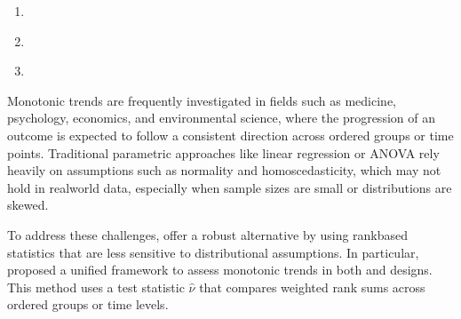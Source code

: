 \documentclass[letterpaper,10pt,english]{jupyterBook}
\begin{document}
\begin{enumerate}
\begin{itemize}
\item {} 
 {\hyperref[\detokenize{intro:visuals.md:balanced-sample-visualization}]{}}

\item {} 
 {\hyperref[\detokenize{intro:visuals.md:unbalanced-sample-visualization}]{}}

\end{itemize}

\item {} 
\sphinxAtStartPar
{\hyperref[\detokenize{intro:discussion.md}]{}}

\item {} 
\sphinxAtStartPar
{\hyperref[\detokenize{intro:conclusion.md}]{}}

\item {} 
\sphinxAtStartPar
{\hyperref[\detokenize{intro:references.md}]{}}

\end{enumerate}

\begin{DUlineblock}{0em}
\item[] 
\end{DUlineblock}

\sphinxAtStartPar
Monotonic trends are frequently investigated in fields such as medicine, psychology, economics, and environmental science, where the progression of an outcome is expected to follow a consistent direction across ordered groups or time points. Traditional parametric approaches like linear regression or ANOVA rely heavily on assumptions such as normality and homoscedasticity, which may not hold in real\sphinxhyphen{}world data, especially when sample sizes are small or distributions are skewed.

\sphinxAtStartPar
To address these challenges,  offer a robust alternative by using rank\sphinxhyphen{}based statistics that are less sensitive to distributional assumptions. In particular,  proposed a unified framework to assess monotonic trends in both  and  designs. This method uses a test statistic \(\hat{\nu}\) that compares weighted rank sums across ordered groups or time levels.
\end{document}
